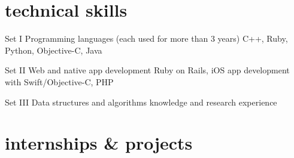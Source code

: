 \documentclass[]{friggeri-cv} %
\begin{document}

\section{technical skills}

\begin{entrylist}
  \entry
  {Set I}
  {Programming languages (each used for more than 3 years)}
  {}
  {C++, Ruby, Python, Objective-C, Java}

  \entry
  {Set II}
  {Web and native app development}
  {}
  {Ruby on Rails, iOS app development with Swift/Objective-C, PHP}

  \sentry
  {Set III}
  {Data structures and algorithms knowledge and research experience}
  {}
\end{entrylist}


\section{internships \& projects}
\end{document}
